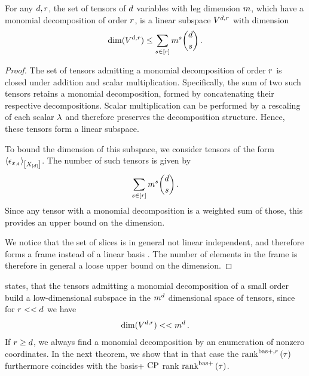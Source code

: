 \begin{theorem}
    \label{the:polynomialSubspaces}
    For any $d, r$, the set of tensors of $d$ variables with leg dimension $m$, which have a monomial decomposition of order $r$, is a linear subspace $V^{d,r}$ with dimension
    \begin{align*}
        \mathrm{dim}(V^{d,r}) \leq  \sum_{s \in [r]} m^s \binom{d}{s} \, .
    \end{align*}
\end{theorem}
\begin{proof}
    The set of tensors admitting a monomial decomposition of order $r$ is closed under addition and scalar multiplication.
    Specifically, the sum of two such tensors retains a monomial decomposition, formed by concatenating their respective decompositions.
    Scalar multiplication can be performed by a rescaling of each scalar $\lambda$ and therefore preserves the decomposition structure.
    Hence, these tensors form a linear subspace.


    To bound the dimension of this subspace, we consider tensors of the form $\left\langle \epsilon_{x_{A}}\right\rangle_{\left[ X_{[d]} \right]}$.
    The number of such tensors is given by
    \begin{align*}
        \sum_{s \in [r]} m^s \binom{d}{s}  \, .
    \end{align*}
    Since any tensor with a monomial decomposition is a weighted sum of those, this provides an upper bound on the dimension.

    We notice that the set of slices is in general not linear independent, and therefore forms a frame instead of a linear basis \cite{casazza_introduction_2013}.
    The number of elements in the frame is therefore in general a loose upper bound on the dimension.
\end{proof}


 states, that the tensors admitting a monomial decomposition of a small order build a low-dimensional subspace in the $m^d$ dimensional space of tensors, since for $r << d $ we have
\begin{align*}
    \mathrm{dim}(V^{d,r}) << m^{d} \, .
\end{align*}
If $r\geq d$, we always find a monomial decomposition by an enumeration of nonzero coordinates.
In the next theorem, we show that in that case the $\mathrm{rank}^{\mathrm{bas+},r}\left(\tau\right)$ furthermore coincides with the basis+ $\mathrm{CP}$ rank $\mathrm{rank}^{\mathrm{bas+}}\left(\tau\right)$.

